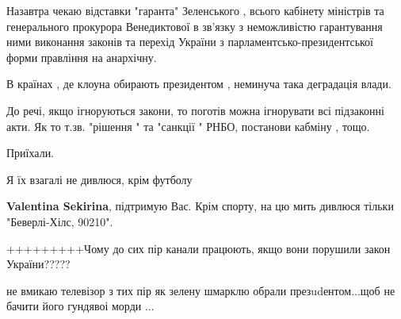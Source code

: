 \begin{itemize}
Назавтра чекаю відставки "гаранта" Зеленського , всього кабінету міністрів та
генерального прокурора Венедиктової в зв'язку з неможливістю гарантування ними
виконання законів та перехід України з парламентсько-президентської форми
правління на анархічну.

В країнах , де клоуна обирають президентом , неминуча така деградація влади.

До речі, якщо ігноруються закони, то поготів можна ігнорувати всі підзаконні
акти. Як то т.зв. "рішення " та "санкції " РНБО, постанови кабміну , тощо.

Приїхали.

 

Я їх взагалі не дивлюся, крім футболу

\begin{itemize}
 
\textbf{Valentina Sekirina}, підтримую Вас. Крім спорту, на цю мить дивлюся тільки "Беверлі-Хілс, 90210".
\end{itemize}

 
+++++++++Чому до сих пір канали працюють, якщо вони порушили закон України?????

 

не вмикаю телевізор з тих пір як зелену шмарклю обрали презudентом...щоб не
бачити його гундявоі морди ...


 


\end{itemize}
